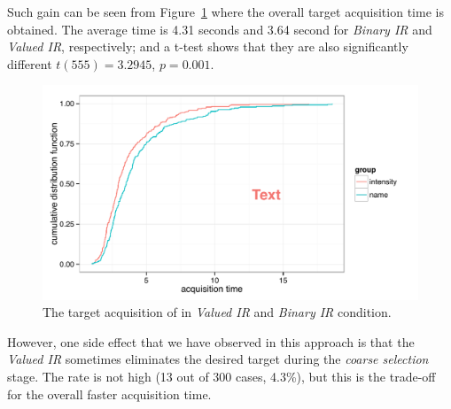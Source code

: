 Such gain can be seen from Figure~\ref{fig:study2} where the overall target acquisition time is obtained. The average time is 4.31 seconds and 3.64 second for {\em Binary IR} and {\em Valued IR}, respectively; and a t-test shows that they are also significantly different $t(555)=3.2945$, $p=0.001$.




\begin{figure}[t]
\centering
\includegraphics[width=0.9\columnwidth]{figures/study2_time.pdf}
\caption{The target acquisition of in {\em Valued IR} and {\em Binary IR} condition.}
\label{fig:study2}
\end{figure}

However, one side effect that we have observed in this approach is that the {\em Valued IR} sometimes eliminates the desired target during the {\em coarse selection} stage. The rate is not high (13 out of 300 cases, 4.3\%), but this is the trade-off for the overall faster acquisition time.

